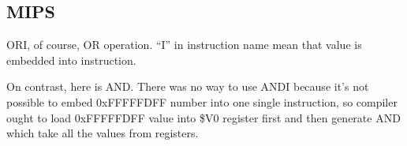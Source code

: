 ﻿\ifx\RUSSIAN\undefined
\subsection{MIPS}



ORI, of course, OR operation. ``I'' in instruction name mean that value is embedded into instruction.

On contrast, here is AND. There was no way to use ANDI because it's not possible to embed 0xFFFFFDFF number
into one single instruction, so compiler ought to load 0xFFFFFDFF value into \$V0 register first and then generate
AND which take all the values from registers.

\fi
